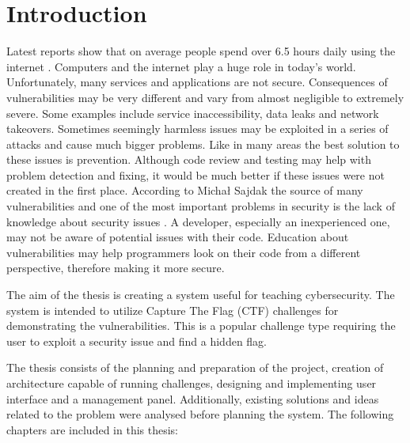 \chapter{Introduction}

Latest reports show that on average people spend over 6.5 hours daily using the internet \cite{bib:digital-2023}. Computers and the internet play a huge role in today's world. Unfortunately, many services and applications are not secure. Consequences of vulnerabilities may be very different and vary from almost negligible to extremely severe. Some examples include service inaccessibility, data leaks and network takeovers. Sometimes seemingly harmless issues may be exploited in a series of attacks and cause much bigger problems. Like in many areas the best solution to these issues is prevention. Although code review and testing may help with problem detection and fixing, it would be much better if these issues were not created in the first place. According to Michał Sajdak the source of many vulnerabilities and one of the most important problems in security is the lack of knowledge about security issues \cite{bib:securitum-wstep}. A developer, especially an inexperienced one, may not be aware of potential issues with their code. Education about vulnerabilities may help programmers look on their code from a different perspective, therefore making it more secure.

The aim of the thesis is creating a system useful for teaching cybersecurity. The system is intended to utilize Capture The Flag (CTF) challenges for demonstrating the vulnerabilities. This is a popular challenge type requiring the user to exploit a security issue and find a hidden flag.

The thesis consists of the planning and preparation of the project, creation of architecture capable of running challenges, designing and implementing user interface and a management panel. Additionally, existing solutions and ideas related to the problem were analysed before planning the system. The following chapters are included in this thesis:

